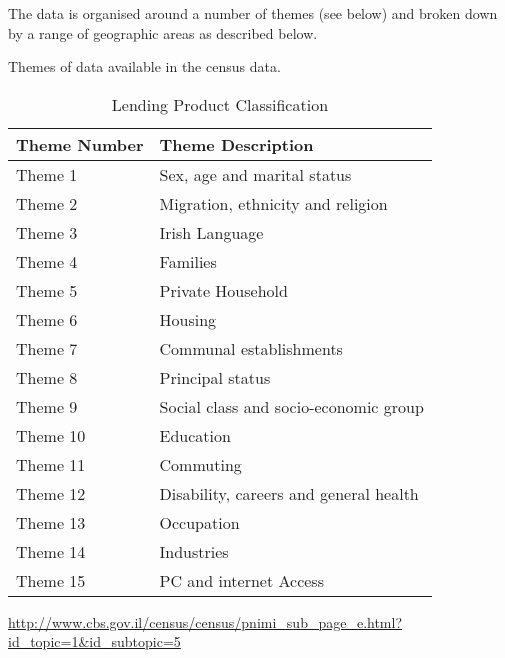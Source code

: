 The data is organised around a number of themes (see below) and broken down by a range of geographic areas as
described below.

Themes of data available in the census data.
\begin{table}[H]
	\centering
	\label{my-label}
	\begin{tabular}{|l|l|}
		\hline
		\textbf{Theme Number} & \textbf{Theme Description} \\ \hline
		Theme 1    & Sex, age and marital status \\ \hline
		Theme 2    & Migration, ethnicity and religion \\ \hline
		Theme 3    & Irish Language \\ \hline
		Theme 4    & Families \\ \hline
		Theme 5    & Private Household \\ \hline
		Theme 6    & Housing \\ \hline
		Theme 7	   & Communal establishments \\ \hline
		Theme 8    & Principal status \\ \hline
		Theme 9    & Social class and socio-economic group \\ \hline
		Theme 10   & Education \\ \hline
		Theme 11   & Commuting \\ \hline	
		Theme 12   & Disability, careers and general health \\ \hline		
		Theme 13   & Occupation \\ \hline
		Theme 14   & Industries \\ \hline
		Theme 15   & PC and internet Access \\ \hline			
	\end{tabular}
	\caption{Lending Product Classification }
\end{table}


\url{http://www.cbs.gov.il/census/census/pnimi_sub_page_e.html?id_topic=1&id_subtopic=5}

